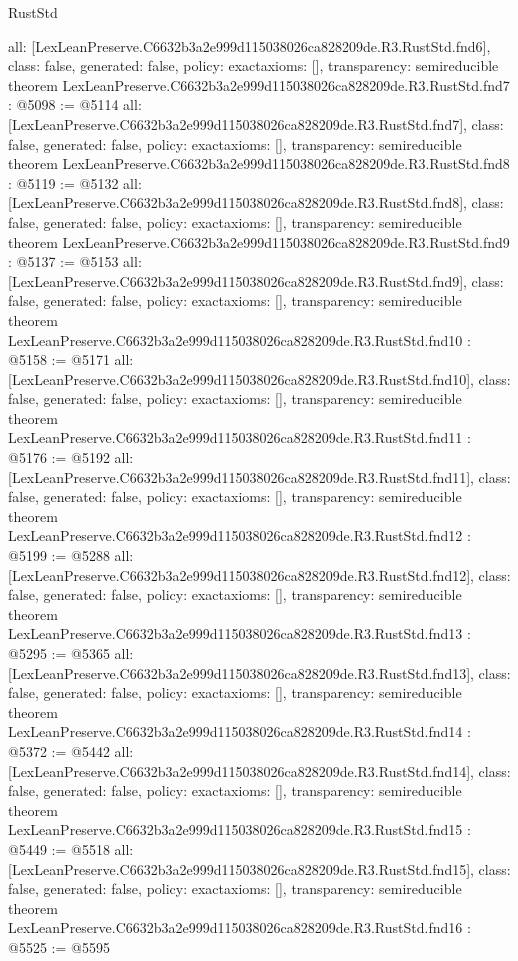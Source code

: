 \begin{lexlean}{RustStd}
\begin{coremodule}
{  all: [LexLeanPreserve.C6632b3a2e999d115038026ca828209de.R3.RustStd.fnd6],
  class: false,
  generated: false,
  policy: exact{axioms: []},
  transparency: semireducible
}
theorem LexLeanPreserve.C6632b3a2e999d115038026ca828209de.R3.RustStd.fnd7 : @5098 := @5114 {
  all: [LexLeanPreserve.C6632b3a2e999d115038026ca828209de.R3.RustStd.fnd7],
  class: false,
  generated: false,
  policy: exact{axioms: []},
  transparency: semireducible
}
theorem LexLeanPreserve.C6632b3a2e999d115038026ca828209de.R3.RustStd.fnd8 : @5119 := @5132 {
  all: [LexLeanPreserve.C6632b3a2e999d115038026ca828209de.R3.RustStd.fnd8],
  class: false,
  generated: false,
  policy: exact{axioms: []},
  transparency: semireducible
}
theorem LexLeanPreserve.C6632b3a2e999d115038026ca828209de.R3.RustStd.fnd9 : @5137 := @5153 {
  all: [LexLeanPreserve.C6632b3a2e999d115038026ca828209de.R3.RustStd.fnd9],
  class: false,
  generated: false,
  policy: exact{axioms: []},
  transparency: semireducible
}
theorem LexLeanPreserve.C6632b3a2e999d115038026ca828209de.R3.RustStd.fnd10 : @5158 := @5171 {
  all: [LexLeanPreserve.C6632b3a2e999d115038026ca828209de.R3.RustStd.fnd10],
  class: false,
  generated: false,
  policy: exact{axioms: []},
  transparency: semireducible
}
theorem LexLeanPreserve.C6632b3a2e999d115038026ca828209de.R3.RustStd.fnd11 : @5176 := @5192 {
  all: [LexLeanPreserve.C6632b3a2e999d115038026ca828209de.R3.RustStd.fnd11],
  class: false,
  generated: false,
  policy: exact{axioms: []},
  transparency: semireducible
}
theorem LexLeanPreserve.C6632b3a2e999d115038026ca828209de.R3.RustStd.fnd12 : @5199 := @5288 {
  all: [LexLeanPreserve.C6632b3a2e999d115038026ca828209de.R3.RustStd.fnd12],
  class: false,
  generated: false,
  policy: exact{axioms: []},
  transparency: semireducible
}
theorem LexLeanPreserve.C6632b3a2e999d115038026ca828209de.R3.RustStd.fnd13 : @5295 := @5365 {
  all: [LexLeanPreserve.C6632b3a2e999d115038026ca828209de.R3.RustStd.fnd13],
  class: false,
  generated: false,
  policy: exact{axioms: []},
  transparency: semireducible
}
theorem LexLeanPreserve.C6632b3a2e999d115038026ca828209de.R3.RustStd.fnd14 : @5372 := @5442 {
  all: [LexLeanPreserve.C6632b3a2e999d115038026ca828209de.R3.RustStd.fnd14],
  class: false,
  generated: false,
  policy: exact{axioms: []},
  transparency: semireducible
}
theorem LexLeanPreserve.C6632b3a2e999d115038026ca828209de.R3.RustStd.fnd15 : @5449 := @5518 {
  all: [LexLeanPreserve.C6632b3a2e999d115038026ca828209de.R3.RustStd.fnd15],
  class: false,
  generated: false,
  policy: exact{axioms: []},
  transparency: semireducible
}
theorem LexLeanPreserve.C6632b3a2e999d115038026ca828209de.R3.RustStd.fnd16 : @5525 := @5595 {
}
\end{coremodule}
\end{lexlean}
